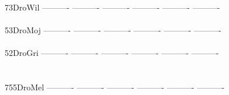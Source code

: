 \documentclass[11pt,twoside,reqno,a4paper]{article}
\begin{document}
{73\hspace*{3\charwidth}DroWil	----------	----------	----------	----------	----------	----------	\\
\hspace*{5\charwidth}\hspace*{7\charwidth}\hspace*{1\charwidth}\hspace*{1\charwidth}\hspace*{1\charwidth}\hspace*{1\charwidth}\hspace*{1\charwidth}\hspace*{1\charwidth}\\
53\hspace*{3\charwidth}DroMoj	----------	----------	----------	----------	----------	----------	\\
\hspace*{5\charwidth}\hspace*{7\charwidth}\hspace*{1\charwidth}\hspace*{1\charwidth}\hspace*{1\charwidth}\hspace*{1\charwidth}\hspace*{1\charwidth}\hspace*{1\charwidth}\\
52\hspace*{3\charwidth}DroGri	----------	----------	----------	----------	----------	----------	\\
\hspace*{5\charwidth}\hspace*{7\charwidth}\hspace*{1\charwidth}\hspace*{1\charwidth}\hspace*{1\charwidth}\hspace*{1\charwidth}\hspace*{1\charwidth}\hspace*{1\charwidth}\\
\\
755\hspace*{2\charwidth}DroMel	----------	----------	----------	----------	----------	----------	\\
\hspace*{5\charwidth}\hspace*{7\charwidth}\hspace*{1\charwidth}\hspace*{1\charwidth}\hspace*{1\charwidth}\hspace*{1\charwidth}\hspace*{1\charwidth}\hspace*{1\charwidth}\\
}
\end{document}
